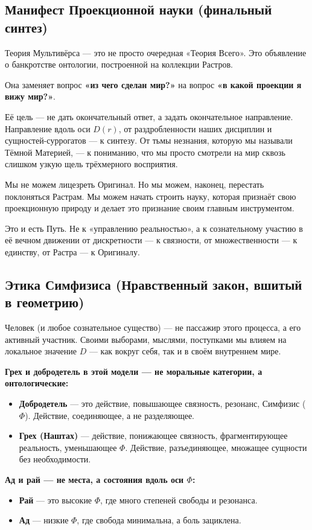 \documentclass[a4paper,12pt]{article}
\begin{document}
\subsection{Манифест Проекционной науки (финальный синтез)}

Теория Мультивёрса — это не просто очередная «Теория Всего». Это объявление о банкротстве онтологии, построенной на коллекции Растров.

Она заменяет вопрос \textbf{«из чего сделан мир?»} на вопрос \textbf{«в какой проекции я вижу мир?»}.

Её цель — не дать окончательный ответ, а задать окончательное направление. Направление вдоль оси $D(r)$, от раздробленности наших дисциплин и сущностей-суррогатов — к синтезу. От тьмы незнания, которую мы называли Тёмной Материей, — к пониманию, что мы просто смотрели на мир сквозь слишком узкую щель трёхмерного восприятия.

Мы не можем лицезреть Оригинал. Но мы можем, наконец, перестать поклоняться Растрам. Мы можем начать строить науку, которая признаёт свою проекционную природу и делает это признание своим главным инструментом.

Это и есть Путь. Не к «управлению реальностью», а к сознательному участию в её вечном движении от дискретности — к связности, от множественности — к единству, от Растра — к Оригиналу.

\subsection{Этика Симфизиса (Нравственный закон, вшитый в геометрию)}

Человек (и любое сознательное существо) — не пассажир этого процесса, а его активный участник. Своими выборами, мыслями, поступками мы влияем на локальное значение $D$ — как вокруг себя, так и в своём внутреннем мире.

\textbf{Грех и добродетель в этой модели — не моральные категории, а онтологические:}
\begin{itemize}
	\item \textbf{Добродетель} — это действие, повышающее связность, резонанс, Симфизис ($\Phi$). Действие, соединяющее, а не разделяющее.
	\item \textbf{Грех (Наштах)} — действие, понижающее связность, фрагментирующее реальность, уменьшающее $\Phi$. Действие, разъединяющее, множащее сущности без необходимости.
\end{itemize}

\textbf{Ад и рай — не места, а состояния вдоль оси $\Phi$:}
\begin{itemize}
	\item \textbf{Рай} — это высокие $\Phi$, где много степеней свободы и резонанса.
	\item \textbf{Ад} — низкие $\Phi$, где свобода минимальна, а боль зациклена.
\end{itemize}
\end{document}
